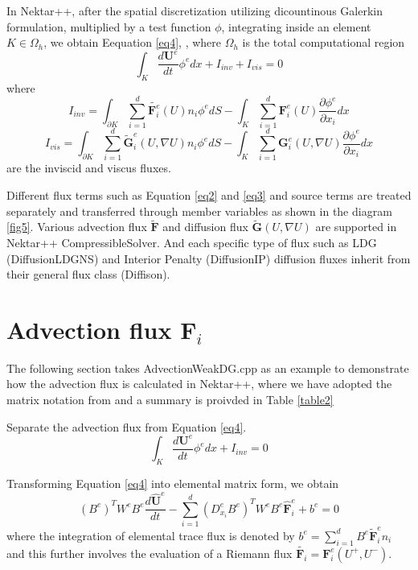 In Nektar++, after the spatial discretization utilizing dicountinous Galerkin formulation, multiplied by a test function $\phi$, integrating inside an element $K\in \Omega_{h}$, we obtain Eequation \eqref{eq4}, , where $\Omega_{h}$ is the total computational region
\begin{equation}\label{eq4}
\int_{K}{\frac{d \textbf{U}^{e}}{d t}\phi^{e} dx}+I_{inv}+I_{vis}=0
\end{equation}
where
\begin{equation}\label{eq2}
I_{inv}={\int_{\partial K}{\sum\limits_{i=1}^{d}{\widetilde{\textbf{F}^{e}_{i}}(U)n_{i}\phi^{e}}}dS}-
{\int_{K}{\sum\limits_{i=1}^{d}{\textbf{F}^{e}_{i}(U)\frac{\partial \phi^{e}}{\partial x_{i}}dx}}}
\end{equation}
\begin{equation}\label{eq3}
I_{vis}= {\int_{\partial K}{\sum\limits_{i=1}^{d}{\widetilde{\textbf{G}}^{e}_{i}(U,\nabla U)n_{i}\phi^{e}}}dS}-
{\int_{K}{\sum\limits_{i=1}^{d}{\textbf{G}^{e}_{i}(U,\nabla U)\frac{\partial \phi^{e}}{\partial x_{i}}dx}}}
\end{equation}
are the inviscid and viscus fluxes.

Different flux terms such as Equation \eqref{eq2} and \eqref{eq3} and source terms are treated separately and transferred through member variables as shown in the diagram \ref{fig5}.
Various advection flux $\widetilde{\textbf{F}}$ and diffusion flux $\widetilde{\textbf{G}}(U,\nabla U)$ are supported in Nektar++ CompressibleSolver. And each specific type of flux such as LDG (DiffusionLDGNS) and Interior Penalty (DiffusionIP) diffusion fluxes inherit from their general flux class (Diffison).

\section{Advection flux $\textbf{F}_{i}$}
The following section takes AdvectionWeakDG.cpp as an example to demonstrate how the advection flux is calculated in Nektar++, where we have adopted the matrix notation from \cite{KaSh05} and a summary is proivded in Table \ref{table2}

Separate the advection flux from Equation \eqref{eq4}.
\begin{equation}
\int_{K}{\frac{d \textbf{U}^{e}}{d t}\phi^{e} dx}+I_{inv}=0
\end{equation}

Transforming Equation \eqref{eq4} into elemental matrix form, we obtain
\begin{equation}\label{eq5}
(B^{e})^{T}W^{e}B^{e}\frac{d \hat{\textbf{U}}^{e}}{d t}
-\sum\limits_{i=1}^{d}{(D^{e}_{x_{i}} B^{e})^{T}}W^{e}B^{e}\hat{\textbf{F}}^{e}_{i}+
b^{e}
=0
\end{equation}
where the integration of elemental trace flux is denoted by $b^{e}=\sum\limits_{i=1}^{d}{B^{e}\widetilde{\textbf{F}}^{e}_{i}}n_{i}$ and this further involves the evaluation of a Riemann flux $\widetilde{\textbf{F}_{i}}=\textbf{F}^{e}_{i}(U^{+},U^{-})$.

